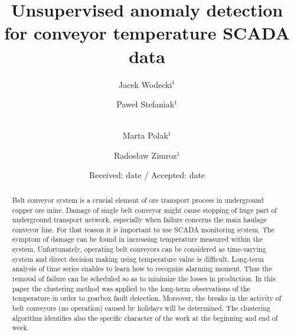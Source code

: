 \smartqed  %
%
\usepackage{graphicx}
%
%
%
%


\title{Unsupervised anomaly detection for conveyor temperature SCADA data%
}


\author{Jacek Wodecki$^1$ \and Pawe{\l} Stefaniak$^1$ \and \\ Marta Polak$^1$ \and Rados{\l}aw Zimroz$^1$}




\date{Received: date / Accepted: date}
\maketitle
\begin{abstract}
Belt conveyor system is a crucial element of ore transport process in underground copper ore mine. Damage of single belt conveyor might cause stopping of huge part of underground transport network, especially when failure concerns the main haulage conveyor line. For that reason it is important to use SCADA monitoring system. The symptom of damage can be found in increasing temperature measured within the system. Unfortunately, operating belt conveyors can be considered as time-varying system and direct decision making using temperature value is difficult. Long-term analysis of time series enables to learn how to recognize alarming moment. Thus the removal of failure can be scheduled so as to minimize the losses in production. In this paper the clustering method was applied to the long-term observations of the temperature in order to gearbox fault detection. Moreover, the breaks in the activity of belt conveyors (no operation) caused by holidays will be determined. The clustering algorithm identifies also  the specific character of the work at the beginning and end of week. 
\end{abstract}
